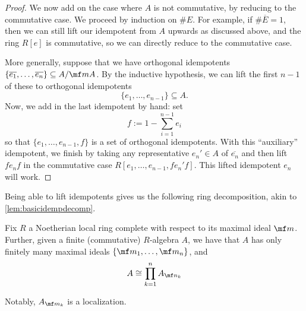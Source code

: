 \begin{proof}
	We now add on the case where $A$ is not commutative, by reducing to the commutative case. We proceed by induction on $\#E$. For example, if $\#\overline E=1$, then we can still lift our idempotent from $A$ upwards as discussed above, and the ring $R[e]$ is commutative, so we can directly reduce to the commutative case.

	More generally, suppose that we have orthogonal idempotents $\{\overline{e_1},\ldots,\overline{e_n}\}\subseteq A/\mf mA$. By the inductive hypothesis, we can lift the first $n-1$ of these to orthogonal idempotents
	\[\{e_1,\ldots,e_{n-1}\}\subseteq A.\]
	Now, we add in the last idempotent by hand: set
	\[f:=1-\sum_{i=1}^{n-1}e_i\]
	so that $\{e_1,\ldots,e_{n-1},f\}$ is a set of orthogonal idempotents. With this ``auxiliary'' idempotent, we finish by taking any representative $e_n'\in A$ of $\overline{e_n}$ and then lift $fe_nf$ in the commutative case $R[e_1,\ldots,e_{n-1},fe_n'f]$. This lifted idempotent $e_n$ will work. %
\end{proof}
Being able to lift idempotents gives us the following ring decomposition, akin to \autoref{lem:basicidempdecomp}.
\begin{lemma}
	Fix $R$ a Noetherian local ring complete with respect to its maximal ideal $\mf m$. Further, given a finite (commutative) $R$-algebra $A$, we have that $A$ has only finitely many maximal ideals $\{\mf m_1,\ldots,\mf m_n\}$, and
	\[A\cong\prod_{k=1}^nA_{\mf n_k}\]
\end{lemma}
Notably, $A_{\mf m_k}$ is a localization.
